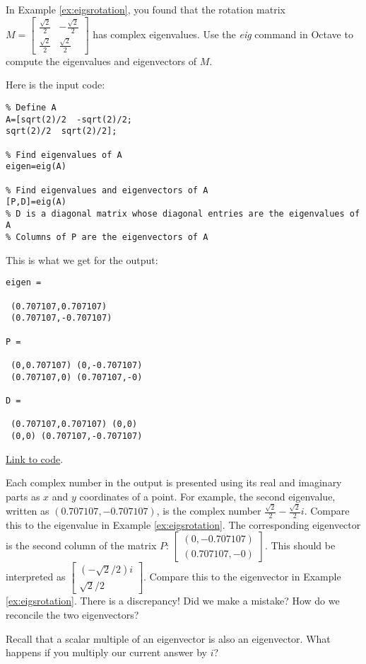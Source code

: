 \documentclass{ximera}
\begin{document}
\begin{example}\label{ex:complexEig}
In Example \ref{ex:eigsrotation}, you found that the rotation matrix $M=\begin{bmatrix}
\frac{\sqrt{2}}{2} & -\frac{\sqrt{2}}{2}\\
\frac{\sqrt{2}}{2} & \frac{\sqrt{2}}{2}
\end{bmatrix}$ has complex eigenvalues.  Use the \emph{eig} command in Octave to compute the eigenvalues and eigenvectors of $M$.  

\begin{explanation}
Here is the input code:

\begin{verbatim}
% Define A
A=[sqrt(2)/2  -sqrt(2)/2;
sqrt(2)/2  sqrt(2)/2];

% Find eigenvalues of A
eigen=eig(A)

% Find eigenvalues and eigenvectors of A
[P,D]=eig(A)
% D is a diagonal matrix whose diagonal entries are the eigenvalues of A
% Columns of P are the eigenvectors of A
\end{verbatim}

This is what we get for the output:
\begin{verbatim}
eigen =

 (0.707107,0.707107)
 (0.707107,-0.707107)

P =

 (0,0.707107) (0,-0.707107)
 (0.707107,0) (0.707107,-0)

D =

 (0.707107,0.707107) (0,0)
 (0,0) (0.707107,-0.707107)
\end{verbatim}

\href{https://sagecell.sagemath.org/?z=eJx1jjELgzAUhPdA_sMtAYWWgmtxkEpnd3EI9amBmGCMbX9-o9BUSrs87n3cHSdQUqcMoeCsyOt5cj7J0lMGHKM-c7bjUTaBcyZwVaYFqZ7MXeqFZthubdtIHm5SpH-MMv5089a9k3V1KJuYFCihghetkr01UmOU3qknHoOd6UPJBLqWOoIf6McigYvVy2i2v_oy7ha8AOuMVgI=&lang=octave&interacts=eJyLjgUAARUAuQ==}{Link to code}.

Each complex number in the output is presented using its real and imaginary parts as $x$ and $y$ coordinates of a point.  For example, the second eigenvalue, written as $(0.707107,-0.707107)$, is the complex number $\frac{\sqrt{2}}{2}-\frac{\sqrt{2}}{2}i$.  Compare this to the eigenvalue in Example \ref{ex:eigsrotation}.  The corresponding eigenvector is the second column of the matrix $P$: $\begin{bmatrix}(0,-0.707107)\\(0.707107,-0)\end{bmatrix}$.  This should be interpreted as $\begin{bmatrix}(-\sqrt{2}/2)i\\\sqrt{2}/2\end{bmatrix}$.  Compare this to the eigenvector in Example \ref{ex:eigsrotation}.  There is a discrepancy!  Did we make a mistake?  How do we reconcile the two eigenvectors?
\begin{hint}
    Recall that a scalar multiple of an eigenvector is also an eigenvector.  What happens if you multiply our current answer by $i$?
\end{hint}
\end{explanation}
\end{example}
\end{document}
